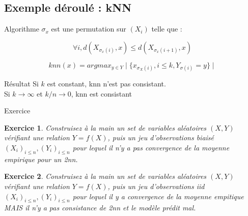 \documentclass[11pt]{beamer}
\newtheorem{exercice}{Exercice}
\begin{document}
\subsection{Exemple déroulé : kNN}

\begin{frame}{Algorithme}
$\sigma_x$ est une permutation sur $(X_i)$ telle que :

$$\forall i, d(X_{\sigma_x(i)},x)\leq d(X_{\sigma_x(i+1)},x)$$

$$knn(x) = argmax_{y \in Y}\mid\{x_{\sigma_X(i)},i\leq k,Y_{\sigma(i)}=y\}\mid$$
\end{frame}

\begin{frame}{Résultat}
Si $k$ est constant, knn n'est pas consistant.\\

\vspace{0.3cm}
Si $k\rightarrow \infty$ et $k/n\rightarrow 0$, knn est consistant
\end{frame}

\begin{frame}{Exercice}

\begin{exercice}
Construisez à la main un set de variables aléatoires $(X,Y)$ vérifiant une relation $Y=f(X)$, puis un jeu d'observations biaisé $(X_i)_{i\leq n},(Y_i)_{i\leq n}$ pour lequel il n'y a pas convergence de la moyenne empirique pour un 2nn. 
\end{exercice}
\begin{exercice}
Construisez à la main un set de variables aléatoires $(X,Y)$ vérifiant une relation $Y=f(X)$, puis un jeu d'observations iid $(X_i)_{i\leq n},(Y_i)_{i\leq n}$ pour lequel il y a convergence de la moyenne empitique MAIS il n'y a pas consistance de 2nn et le modèle prédit mal.
\end{exercice} 
\end{frame}
\end{document}
